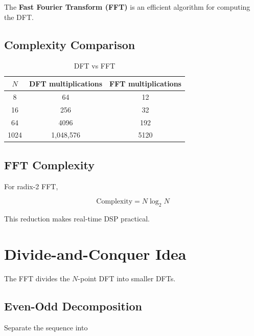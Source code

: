 The \textbf{Fast Fourier Transform (FFT)} is an efficient algorithm for computing
the DFT.


\subsection{Complexity Comparison}

\begin{table}[H]
\centering
\caption{DFT vs FFT}
\begin{tabular}{|c|c|c|}
\hline
\textbf{\(N\)} & \textbf{DFT multiplications} & \textbf{FFT multiplications}\\
\hline
8 & 64 & 12\\
16 & 256 & 32\\
64 & 4096 & 192\\
1024 & 1,048,576 & 5120\\
\hline
\end{tabular}
\end{table}


\subsection{FFT Complexity}

For radix-2 FFT,

\[
\boxed{
\text{Complexity}=N\log_2N
}
\]

This reduction makes real-time DSP practical.


\section{Divide-and-Conquer Idea}

The FFT divides the \(N\)-point DFT into smaller DFTs.


\subsection{Even-Odd Decomposition}

Separate the sequence into

